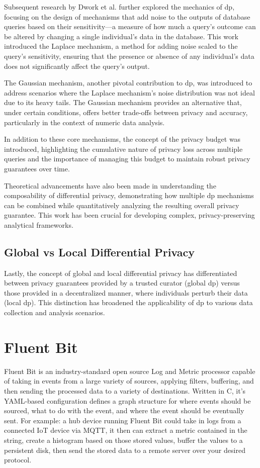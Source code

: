 Subsequent research by Dwork et al. further explored the mechanics of \acrshort{dp}, focusing on the design of mechanisms that add noise to the outputs of database queries based on their sensitivity—a measure of how much a query's outcome can be altered by changing a single individual's data in the database\cite{Dwork2006calibrating}. This work introduced the Laplace mechanism, a method for adding noise scaled to the query's sensitivity, ensuring that the presence or absence of any individual's data does not significantly affect the query's output.

The Gaussian mechanism, another pivotal contribution to \acrshort{dp}, was introduced to address scenarios where the Laplace mechanism's noise distribution was not ideal due to its heavy tails. The Gaussian mechanism provides an alternative that, under certain conditions, offers better trade-offs between privacy and accuracy, particularly in the context of numeric data analysis\cite{Dwork2014}.

In addition to these core mechanisms, the concept of the privacy budget was introduced, highlighting the cumulative nature of privacy loss across multiple queries and the importance of managing this budget to maintain robust privacy guarantees over time\cite{McSherry2007}.

Theoretical advancements have also been made in understanding the composability of differential privacy, demonstrating how multiple \acrshort{dp} mechanisms can be combined while quantitatively analyzing the resulting overall privacy guarantee. This work has been crucial for developing complex, privacy-preserving analytical frameworks\cite{Dwork2014}.

\subsection{Global vs Local Differential Privacy}
Lastly, the concept of global and local differential privacy has differentiated between privacy guarantees provided by a trusted curator (global \acrshort{dp}) versus those provided in a decentralized manner, where individuals perturb their data (local \acrshort{dp}). This distinction has broadened the applicability of \acrshort{dp} to various data collection and analysis scenarios\cite{kasiviswanathan2010learn}.

\section{Fluent Bit}
Fluent Bit is an industry-standard open source Log and Metric processor capable of taking in events from a large variety of sources, applying filters, buffering, and then sending the processed data to a variety of destinations.\cite{What-is-Fluent-Bit} Written in C, it's YAML-based configuration defines a graph structure for where events should be sourced, what to do with the event, and where the event should be eventually sent. For example: a hub device running Fluent Bit could take in logs from a connected IoT device via MQTT, it then can extract a metric contained in the string, create a histogram based on those stored values, buffer the values to a persistent disk, then send the stored data to a remote server over your desired protocol.
